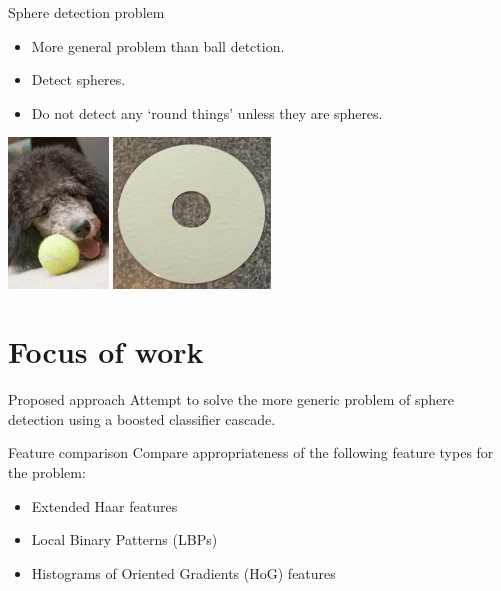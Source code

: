 \documentclass{beamer}
\newcommand{\scarequotes}[1]{`#1'}
\begin{document}
	\begin{frame}{Sphere detection problem}
		\begin{itemize}
			\item More general problem than ball detction.
			\item Detect spheres.
			\item Do not detect any \scarequotes{round things} unless they are spheres.
		\end{itemize}
		\begin{table}[h]
			\centering
			\includegraphics[height=4cm]{training_images/positive/n04409515_2793}
			\includegraphics[height=4cm]{training_images/hard_negative/n03208556_9694}
		\end{table}
	\end{frame}

\section{Focus of work}
	\begin{frame}{Proposed approach}
		Attempt to solve the more generic problem of sphere detection using a boosted classifier cascade.
	\end{frame}

	\begin{frame}{Feature comparison}
		Compare appropriateness of the following feature types for the problem: \\
		\begin{itemize}
			\item Extended Haar features \citep{Lienhart2002extended}
			\item Local Binary Patterns (LBPs) \citep{liao2007learning}
			\item Histograms of Oriented Gradients (HoG) features \citep{dalal2005histograms}
		\end{itemize}
	\end{frame}
\end{document}
